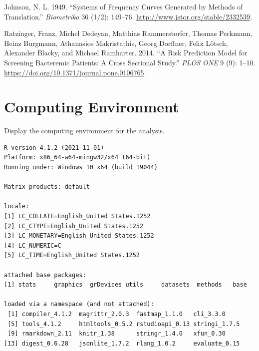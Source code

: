 \documentclass[
  letterpaper,
  DIV=11,
  numbers=noendperiod]{scrreport}
\newlength{\cslhangindent}
\newlength{\cslentryspacingunit} %
\newenvironment{CSLReferences}[2] %
 {%
  \setlength{\parindent}{0pt}
  \ifodd #1
  \let\oldpar\par
  \def\par{\hangindent=\cslhangindent\oldpar}
  \fi
  \setlength{\parskip}{#2\cslentryspacingunit}
 }%
 {}
\begin{document}
\hypertarget{refs}{}
\begin{CSLReferences}{1}{0}
\leavevmode{}%
Johnson, N. L. 1949. {``Systems of Frequency Curves Generated by Methods
of Translation.''} \emph{Biometrika} 36 (1/2): 149--76.
\url{http://www.jstor.org/stable/2332539}.

\leavevmode{}%
Ratzinger, Franz, Michel Dedeyan, Matthias Rammerstorfer, Thomas
Perkmann, Heinz Burgmann, Athanasios Makristathis, Georg Dorffner, Felix
Lötsch, Alexander Blacky, and Michael Ramharter. 2014. {``A Risk
Prediction Model for Screening Bacteremic Patients: A Cross Sectional
Study.''} \emph{PLOS ONE} 9 (9): 1--10.
\url{https://doi.org/10.1371/journal.pone.0106765}.

\end{CSLReferences}


\hypertarget{SessionInfo}{%
\chapter{Computing Environment}\label{SessionInfo}}

Display the computing environment for the analysis.

\begin{verbatim}
R version 4.1.2 (2021-11-01)
Platform: x86_64-w64-mingw32/x64 (64-bit)
Running under: Windows 10 x64 (build 19044)

Matrix products: default

locale:
[1] LC_COLLATE=English_United States.1252 
[2] LC_CTYPE=English_United States.1252   
[3] LC_MONETARY=English_United States.1252
[4] LC_NUMERIC=C                          
[5] LC_TIME=English_United States.1252    

attached base packages:
[1] stats     graphics  grDevices utils     datasets  methods   base     

loaded via a namespace (and not attached):
 [1] compiler_4.1.2  magrittr_2.0.3  fastmap_1.1.0   cli_3.3.0      
 [5] tools_4.1.2     htmltools_0.5.2 rstudioapi_0.13 stringi_1.7.5  
 [9] rmarkdown_2.11  knitr_1.38      stringr_1.4.0   xfun_0.30      
[13] digest_0.6.28   jsonlite_1.7.2  rlang_1.0.2     evaluate_0.15  
\end{verbatim}
\end{document}
